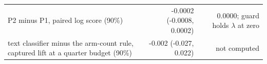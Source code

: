 \begin{tabular}{lrr}
P2 minus P1, paired log score (90\%) & -0.0002 (-0.0008, 0.0002) & 0.0000; guard holds $\lambda$ at zero \\
text classifier minus the arm-count rule, captured lift at a quarter budget (90\%) & -0.002 (-0.027, 0.022) & not computed \\
\bottomrule
\end{tabular}
